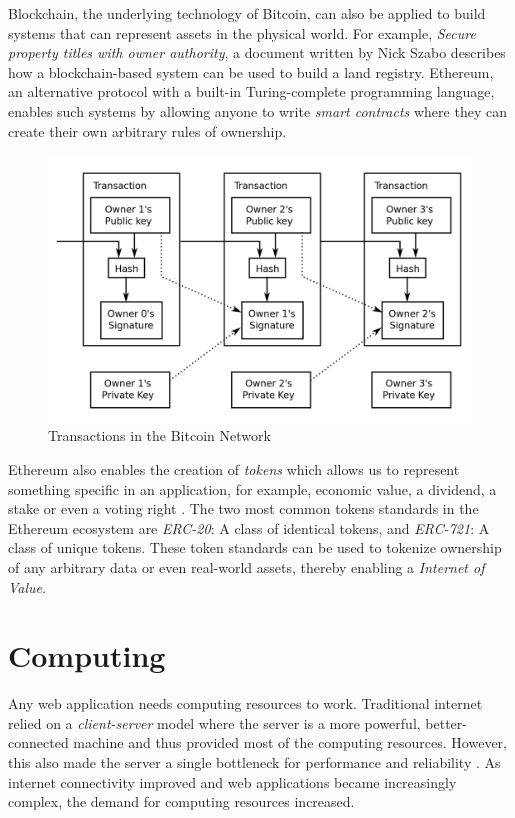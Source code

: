 	Blockchain, the underlying technology of Bitcoin, can also be applied to build systems that can represent assets in the physical world. For example, \textit{Secure property titles with owner authority}\cite{szabo1998nick}, a document written by Nick Szabo describes how a blockchain-based system can be used to build a land registry. Ethereum\cite{buterin2014ethereum}, an alternative protocol with a built-in Turing-complete programming language, enables such systems by allowing anyone to write \textit{smart contracts}\cite{szabo1997formalizing} where they can create their own arbitrary rules of ownership.
	
	\begin{figure}[h]
		\includegraphics[width=\linewidth]{figures/bitcoin-transactions}
		\caption{\label{fig:bitcoin-transactions} Transactions in the Bitcoin Network\protect\cite{image:bitcoin:transaction:1}}
	\end{figure}
	
	Ethereum also enables the creation of \textit{tokens} which allows us to represent something specific in an application, for example, economic value, a dividend, a stake or even a voting right \cite{token:roles:1}. The two most common tokens standards in the Ethereum ecosystem are \textit{ERC-20}\cite{github:eip:20}: A class of identical tokens, and \textit{ERC-721}\cite{github:eip:721}: A class of unique tokens. These token standards can be used to tokenize ownership of any arbitrary data or even real-world assets, thereby enabling a \textit{Internet of Value}\cite{vuong2019long}.

\cleardoublepage
\section{Computing}
	Any web application needs computing resources to work. Traditional internet relied on a \textit{client-server} model where the server is a more powerful, better-connected machine and thus provided most of the computing resources. However, this also made the server a single bottleneck for performance and reliability \cite{crowcroft2003peer}. As internet connectivity improved and web applications became increasingly complex, the demand for computing resources increased.
	
